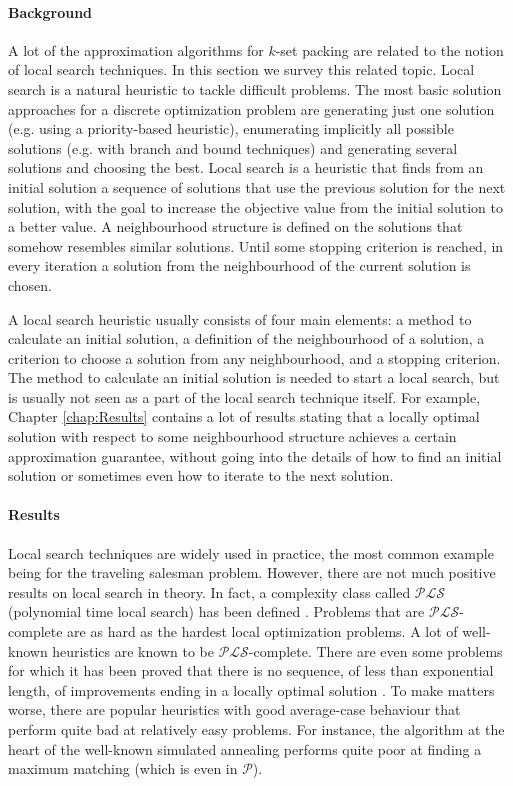 \paragraph{Background} A lot of the approximation algorithms for $k$-set packing are related to the notion of local search techniques. In this section we survey this related topic. Local search is a natural heuristic to tackle difficult problems. The most basic solution approaches for a discrete optimization problem are generating just one solution (e.g. using a priority-based heuristic), enumerating implicitly all possible solutions (e.g. with branch and bound techniques) and generating several solutions and choosing the best. Local search is a heuristic that finds from an initial solution a sequence of solutions that use the previous solution for the next solution, with the goal to increase the objective value from the initial solution to a better value. A neighbourhood structure is defined on the solutions that somehow resembles similar solutions. Until some stopping criterion is reached, in every iteration a solution from the neighbourhood of the current solution is chosen.

A local search heuristic usually consists of four main elements: a method to calculate an initial solution, a definition of the neighbourhood of a solution, a criterion to choose a solution from any neighbourhood, and a stopping criterion. The method to calculate an initial solution is needed to start a local search, but is usually not seen as a part of the local search technique itself. For example, Chapter \ref{chap:Results} contains a lot of results stating that a locally optimal solution with respect to some neighbourhood structure achieves a certain approximation guarantee, without going into the details of how to find an initial solution or sometimes even how to iterate to the next solution.

\paragraph{Results} Local search techniques are widely used in practice, the most common example being for the traveling salesman problem. However, there are not much positive results on local search in theory. In fact, a complexity class called $\mathcal{PLS}$ (polynomial time local search) has been defined \cite{PLS}. Problems that are $\mathcal{PLS}$-complete are as hard as the hardest local optimization problems. A lot of well-known heuristics are known to be $\mathcal{PLS}$-complete. There are even some problems for which it has been proved that there is no sequence, of less than exponential length, of improvements ending in a locally optimal solution \cite{Halldorsson}. To make matters worse, there are popular heuristics with good average-case behaviour that perform quite bad at relatively easy problems. For instance, the algorithm at the heart of the well-known simulated annealing performs quite poor at finding a maximum matching (which is even in $\mathcal{P}$).


